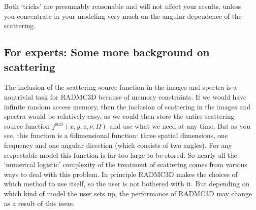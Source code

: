 \documentclass[letterpaper,10pt,english]{sphinxmanual}
\begin{document}
Both ‘tricks’ are presumably reasonable and will not affect your results, unless
you concentrate in your modeling very much on the angular dependence of the
scattering.


\subsection{For experts: Some more background on scattering}
\label{\detokenize{dustradtrans:for-experts-some-more-background-on-scattering}}\label{\detokenize{dustradtrans:sec-scat-background}}
The inclusion of the scattering source function in the images and spectra is a
non\sphinxhyphen{}trivial task for RADMC\sphinxhyphen{}3D because of memory constraints. If we would have
infinite random access memory, then the inclusion of scattering in the images
and spectra would be relatively easy, as we could then store the entire
scattering source function \(j^{\mathrm{scat}}(x,y,z,\nu,\Omega)\) and use
what we need at any time. But as you see, this function is a 6\sphinxhyphen{}dimensional
function: three spatial dimensions, one frequency and one angular direction
(which consists of two angles). For any respectable model this function is far
too large to be stored. So nearly all the ‘numerical logistic’ complexity of the
treatment of scattering comes from various ways to deal with this problem. In
principle RADMC\sphinxhyphen{}3D makes the choices of which method to use itself, so the user
is not bothered with it. But depending on which kind of model the user sets up,
the performance of RADMC\sphinxhyphen{}3D may change as a result of this issue.
\end{document}
